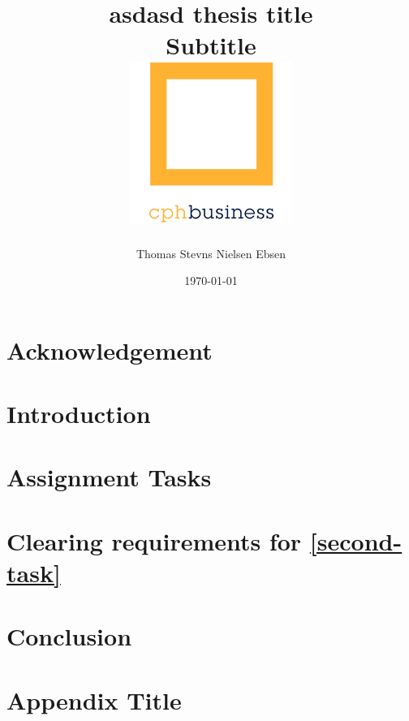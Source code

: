 \documentclass[12pt]{report}
\title{
    {asdasd thesis title}\\
    {\large Subtitle}\\
    {\includegraphics{cphbusiness-small.png}}
}
\author{Thomas Stevns Nielsen Ebsen}
\date{\today}
\begin{document}




\chapter*{Acknowledgement}


\tableofcontents
\listoffigures
\listoftables

\chapter{Introduction}


\chapter{Assignment Tasks}



\chapter{Clearing requirements for \ref{second-task}}





\chapter{Conclusion}


\appendix
\chapter{Appendix Title}


\printbibliography

\listoftodos
\end{document}
